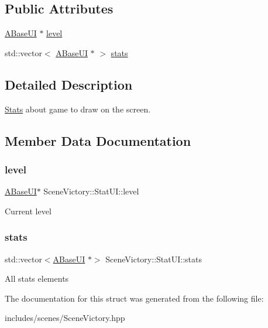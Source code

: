 \subsection*{Public Attributes}
\begin{DoxyCompactItemize}
\item 
\hyperlink{class_a_base_u_i}{A\+Base\+UI} $\ast$ \hyperlink{struct_scene_victory_1_1_stat_u_i_a297aedc4b8cbd5808bfc7001739a5c95}{level}
\item 
std\+::vector$<$ \hyperlink{class_a_base_u_i}{A\+Base\+UI} $\ast$ $>$ \hyperlink{struct_scene_victory_1_1_stat_u_i_a5cd26b66eb1e91a770ce3087b0014373}{stats}
\end{DoxyCompactItemize}


\subsection{Detailed Description}
\hyperlink{class_stats}{Stats} about game to draw on the screen. 

\subsection{Member Data Documentation}
\mbox{\label{struct_scene_victory_1_1_stat_u_i_a297aedc4b8cbd5808bfc7001739a5c95}} 
\subsubsection{\texorpdfstring{level}{level}}
{\footnotesize\ttfamily \hyperlink{class_a_base_u_i}{A\+Base\+UI}$\ast$ Scene\+Victory\+::\+Stat\+U\+I\+::level}

Current level \mbox{\label{struct_scene_victory_1_1_stat_u_i_a5cd26b66eb1e91a770ce3087b0014373}} 
\subsubsection{\texorpdfstring{stats}{stats}}
{\footnotesize\ttfamily std\+::vector$<$\hyperlink{class_a_base_u_i}{A\+Base\+UI} $\ast$$>$ Scene\+Victory\+::\+Stat\+U\+I\+::stats}

All stats elements 

The documentation for this struct was generated from the following file\+:\begin{DoxyCompactItemize}
\item 
includes/scenes/Scene\+Victory.\+hpp\end{DoxyCompactItemize}
